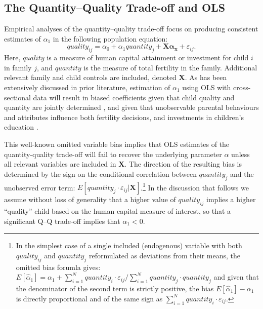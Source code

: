 \documentclass[subeqn]{article}
\begin{document}
\begin{spacing}{1.4}
\subsection{The Quantity--Quality Trade-off and OLS}
\label{sscn:OLS}
Empirical analyses of the quantity--quality trade-off focus on producing
consistent estimates of $\alpha_1$ in the following population equation:
\begin{equation}
  \label{TWINeqn:RF}
  quality_{ij}=\alpha_0+\alpha_1 quantity_{j} + \bm{X}\bm{\alpha_x}+\varepsilon_{ij}.
\end{equation}
Here, $quality$ is a measure of human capital attainment or investment for child
$i$ in family $j$, and $quantity$ is the measure of total fertility in the
family. Additional relevant family and child controls are included, denoted $\bm{X}$.
As has been extensively discussed in prior literature, estimation of $\alpha_1$
using OLS with cross-sectional data will result in biased coefficients given that
child quality and quantity are jointly determined \citep{BeckerLewis1973,
  BeckerTomes1976}, and given that unobservable parental behaviours and attributes
influence both fertility decisions, and investments in children's education
\citep{Qian2009}.

This well-known omitted variable bias implies that OLS estimates of
the quantity-quality trade-off will fail to recover the underlying parameter
$\alpha$ unless all relevant variables are included in $\bm{X}$. The direction
of the resulting bias is determined by the sign on the conditional correlation
between $quantity_j$ and the unobserved error term:
$E[quantity_{j}\cdot\varepsilon_{ij}|\bm{X}]$.\footnote{In the simplest case
  of a single included (endogenous) variable with both $quality_{ij}$ and
  $quantity_j$ reformulated as deviations from their means, the omitted bias
  forumla gives:
  $
  E[\hat\alpha_1]=\alpha_1+\sum_{i=1}^N quantity_i\cdot\varepsilon_{ij}/\sum_{i=1}^N quantity_j\cdot quantity_j
  $
  and given that the denominator of the second term is strictly positive, the
  bias $E[\hat\alpha_1]-\alpha_1$ is directly proportional and of the same
  sign as $\sum_{i=1}^N quantity_i\cdot\varepsilon_{ij}$.
}
In the discussion that follows we assume without loss of generality that a higher
value of $quality_{ij}$ implies a higher ``quality'' child based on the human capital
measure of interest, so that a significant Q--Q trade-off implies that $\alpha_1<0$.



\end{spacing}
\end{document}
